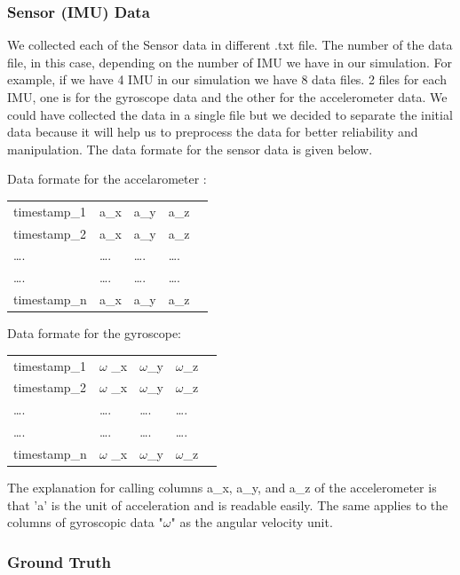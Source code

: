 \subsubsection{Sensor (IMU) Data}
We collected each of the Sensor data in different .txt file. The number of the data file, in this case, depending on the number of IMU we have in our simulation. For example, if we have 4 IMU in our simulation we have 8 data files. 2 files for each IMU, one is for the gyroscope data and the other for the accelerometer data. We could have collected the data in a single file but we decided to separate the initial data because it will help us to preprocess the data for better reliability and manipulation. The data formate for the sensor data is given below.

Data formate for the accelarometer :
\begin{table}[h]
\begin{tabular}{lllll}
 timestamp\_1 & a\_x &  a\_y &  a\_z  \\
 timestamp\_2 & a\_x &  a\_y &  a\_z   \\
…. & …. &  …. & ….  \\
…. & …. &  …. & ….  \\
 timestamp\_n & a\_x &  a\_y &  a\_z 
\end{tabular}
\end{table}



Data formate for the gyroscope:

\begin{table}[h]
\begin{tabular}{lllll}
 timestamp\_1 & $ \omega $ \_x &   $ \omega $\_y &   $ \omega $\_z  \\
 timestamp\_2 & $ \omega $ \_x &   $ \omega $\_y &   $ \omega $\_z  \\
…. & …. &  …. & ….  \\
…. & …. &  …. & ….  \\
 timestamp\_n & $ \omega $ \_x &   $ \omega $\_y &   $ \omega $\_z 
\end{tabular}
\end{table}



The explanation for calling columns a\_x, a\_y, and a\_z of the accelerometer is that 'a' is the unit of acceleration and is readable easily. The same applies to the columns of gyroscopic data "$ \omega $" as the angular velocity unit.

\subsubsection{Ground Truth}

